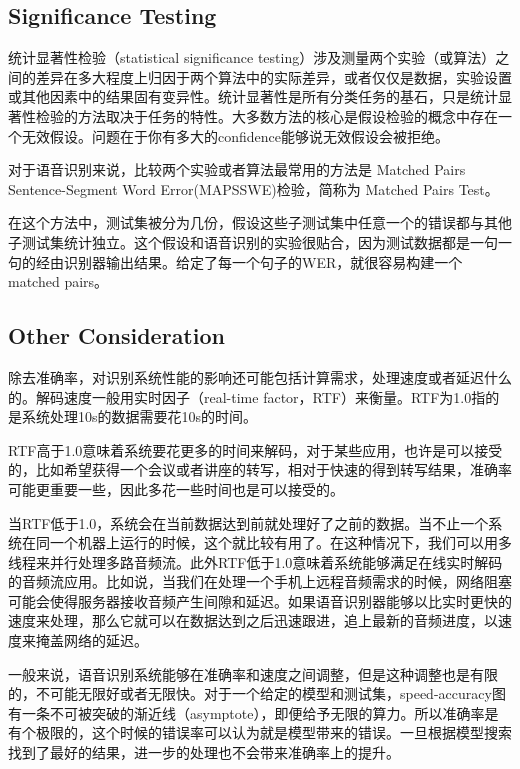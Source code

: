 
\subsection{Significance Testing} %
\label{sub:significance_testing}
统计显著性检验（statistical significance testing）涉及测量两个实验（或算法）之间的差异在多大程度上归因于两个算法中的实际差异，或者仅仅是数据，实验设置或其他因素中的结果固有变异性。统计显著性是所有分类任务的基石，只是统计显著性检验的方法取决于任务的特性。大多数方法的核心是假设检验的概念中存在一个无效假设。问题在于你有多大的confidence能够说无效假设会被拒绝。

对于语音识别来说，比较两个实验或者算法最常用的方法是 Matched Pairs Sentence-Segment Word Error(MAPSSWE)检验，简称为 Matched Pairs Test。

在这个方法中，测试集被分为几份，假设这些子测试集中任意一个的错误都与其他子测试集统计独立。这个假设和语音识别的实验很贴合，因为测试数据都是一句一句的经由识别器输出结果。给定了每一个句子的WER，就很容易构建一个matched pairs。

\subsection{Other Consideration} %
\label{sub:other_consideration}
除去准确率，对识别系统性能的影响还可能包括计算需求，处理速度或者延迟什么的。解码速度一般用实时因子（real-time factor，RTF）来衡量。RTF为1.0指的是系统处理10s的数据需要花10s的时间。

RTF高于1.0意味着系统要花更多的时间来解码，对于某些应用，也许是可以接受的，比如希望获得一个会议或者讲座的转写，相对于快速的得到转写结果，准确率可能更重要一些，因此多花一些时间也是可以接受的。

当RTF低于1.0，系统会在当前数据达到前就处理好了之前的数据。当不止一个系统在同一个机器上运行的时候，这个就比较有用了。在这种情况下，我们可以用多线程来并行处理多路音频流。此外RTF低于1.0意味着系统能够满足在线实时解码的音频流应用。比如说，当我们在处理一个手机上远程音频需求的时候，网络阻塞可能会使得服务器接收音频产生间隙和延迟。如果语音识别器能够以比实时更快的速度来处理，那么它就可以在数据达到之后迅速跟进，追上最新的音频进度，以速度来掩盖网络的延迟。

一般来说，语音识别系统能够在准确率和速度之间调整，但是这种调整也是有限的，不可能无限好或者无限快。对于一个给定的模型和测试集，speed-accuracy图有一条不可被突破的渐近线（asymptote），即便给予无限的算力。所以准确率是有个极限的，这个时候的错误率可以认为就是模型带来的错误。一旦根据模型搜索找到了最好的结果，进一步的处理也不会带来准确率上的提升。

